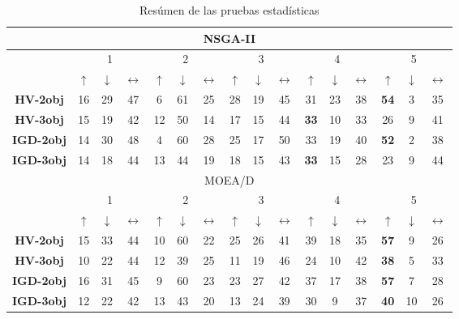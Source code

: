 \begin{table}[t]
\centering
\caption{Resúmen de las pruebas estadísticas}
\label{tab:statistical_Tests}
\begin{tabular}{|c|c|c|c|c|c|c|c|c|c|c|c|c|c|c|c|}
\hline
\multicolumn{16}{|c|}{NSGA-II} \\ \hline
 & \multicolumn{3}{c|}{1} & \multicolumn{3}{c|}{2} & \multicolumn{3}{c|}{3} & \multicolumn{3}{c|}{4} & \multicolumn{3}{c|}{5} \\ \hline
 & $\uparrow$ & $\downarrow$ & $\longleftrightarrow$ & $\uparrow$ & $\downarrow$ & $\longleftrightarrow$ & $\uparrow$ & $\downarrow$ & $\longleftrightarrow$ & $\uparrow$ & $\downarrow$ & $\longleftrightarrow$ & $\uparrow$ & $\downarrow$ & $\longleftrightarrow$ \\ \hline
\textbf{HV-2obj} & 16 & 29 & 47 & 6 & 61 & 25 & 28 & 19 & 45 & 31 & 23 & 38 & \textbf{54} & 3 & 35 \\ \hline
\textbf{HV-3obj} & 15 & 19 & 42 & 12 & 50 & 14 & 17 & 15 & 44 & \textbf{33} & 10 & 33 & 26 & 9 & 41 \\ \hline
\textbf{IGD-2obj} & 14 & 30 & 48 & 4 & 60 & 28 & 25 & 17 & 50 & 33 & 19 & 40 & \textbf{52} & 2 & 38 \\ \hline
\textbf{IGD-3obj} & 14 & 18 & 44 & 13 & 44 & 19 & 18 & 15 & 43 & \textbf{33} & 15 & 28 & 23 & 9 & 44 \\ \hline

\hline
\hline
\multicolumn{16}{|c|}{MOEA/D} \\ \hline
 & \multicolumn{3}{c|}{1} & \multicolumn{3}{c|}{2} & \multicolumn{3}{c|}{3} & \multicolumn{3}{c|}{4} & \multicolumn{3}{c|}{5} \\ \hline
 & $\uparrow$ & $\downarrow$ & $\longleftrightarrow$ & $\uparrow$ & $\downarrow$ & $\longleftrightarrow$ & $\uparrow$ & $\downarrow$ & $\longleftrightarrow$ & $\uparrow$ & $\downarrow$ & $\longleftrightarrow$ & $\uparrow$ & $\downarrow$ & $\longleftrightarrow$ \\ \hline
\textbf{HV-2obj} & 15 & 33 & 44 & 10 & 60 & 22 & 25 & 26 & 41 & 39 & 18 & 35 & \textbf{57} & 9 & 26 \\ \hline
\textbf{HV-3obj} & 10 & 22 & 44 & 12 & 39 & 25 & 11 & 19 & 46 & 24 & 10 & 42 & \textbf{38} & 5 & 33 \\ \hline
\textbf{IGD-2obj} & 16 & 31 & 45 & 9 & 60 & 23 & 23 & 27 & 42 & 37 & 17 & 38 & \textbf{57} & 7 & 28 \\ \hline
\textbf{IGD-3obj} & 12 & 22 & 42 & 13 & 43 & 20 & 13 & 24 & 39 & 30 & 9 & 37 & \textbf{40} & 10 & 26 \\ \hline


\end{tabular}
\end{table}
